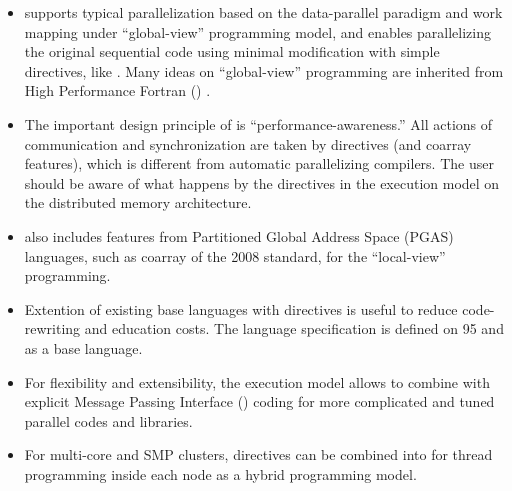 \begin{itemize}

 \item {\XMP} supports typical parallelization based on the
       data-parallel paradigm and work mapping under ``global-view''
       programming model, and enables parallelizing the original
       sequential code using minimal modification with simple
       directives, like {\OMP}. Many ideas on ``global-view''
       programming are inherited from High Performance Fortran ({\HPF})
       \cite{hpf}.

 \item The important design principle of {\XMP} is
       ``performance-awareness.'' All actions of communication and
       synchronization are taken by directives (and coarray features),
       which is different from automatic parallelizing compilers. The
       user should be aware of what happens by the {\XMP} directives in
       the execution model on the distributed memory architecture.

 \item {\XMP} also includes features from Partitioned Global Address
       Space (PGAS) languages, such as coarray of the {\Fort} 2008
       standard, for the ``local-view'' programming.

 \item Extention of existing base languages with directives is useful to
       reduce code-rewriting and education costs. The {\XMP} language
       specification is defined on {\Fort} 95 and {\C} as a base
       language.

 \item For flexibility and extensibility, the execution model allows to
       combine with explicit Message Passing Interface ({\MPI})
       \cite{mpi} coding for more complicated and tuned parallel codes
       and libraries.

 \item For multi-core and SMP clusters, {\OMP} directives can be
       combined into {\XMP} for thread programming inside each node as a
       hybrid programming model.


\end{itemize}
